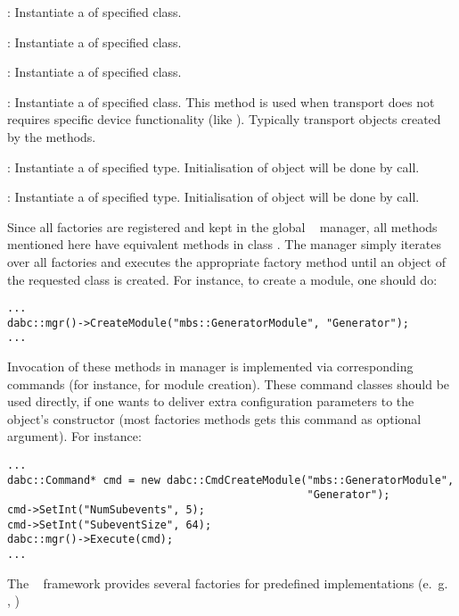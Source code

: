 \item [\func{CreateDevice()}] : 
	Instantiate a  of specified class. 

\item [\func{CreateThread()}] : 
   Instantiate a  of specified class.
	
\item [\func{CreateApplication()}] : 
	Instantiate a  of specified class.

\item [\func{CreateTransport()}] : 
   Instantiate a  of specified class.
   This method is used when transport does not requires specific device functionality
   (like ). Typically transport objects
   created by the  methods.   
	
\item [\func{CreateDataInput()}] : 
   Instantiate a  of specified type.
   Initialisation of object will be done by  call.

\item [\func{CreateDataOutput()}] : 
   Instantiate a  of specified type.
   Initialisation of object will be done by  call.
	
\edes      

Since all factories are registered and kept in the global \dabc~ manager, 
all methods mentioned here  have equivalent methods in class .
The manager simply iterates over all factories and executes the appropriate factory method
until an object of the requested class is created. For instance, to create a module, one should do:

\begin{small}
\begin{verbatim}
...
dabc::mgr()->CreateModule("mbs::GeneratorModule", "Generator");
...
\end{verbatim}     
\end{small}

Invocation of these methods in manager is implemented via corresponding commands
(for instance,  for module creation). 
These command classes should be used directly, if one wants to deliver extra 
configuration parameters to the object's constructor (most factories methods gets
this command as optional argument). For instance:

\begin{small}
\begin{verbatim}
...
dabc::Command* cmd = new dabc::CmdCreateModule("mbs::GeneratorModule", 
                                               "Generator");
cmd->SetInt("NumSubevents", 5);
cmd->SetInt("SubeventSize", 64);
dabc::mgr()->Execute(cmd);
...
\end{verbatim}     
\end{small}

The \dabc~ framework provides several factories for predefined 
implementations (e.~g.~ , )






